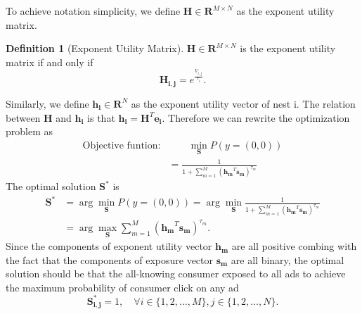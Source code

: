 \documentclass[12pt]{article}
\theoremstyle{definition}
\newtheorem{definition}{Definition}[section]
\newcommand{\matr}[1]{\mathbf{#1}} %
\begin{document}
\begin{sloppypar}
To achieve notation simplicity, we define $\matr{H} \in \mathbf{R}^{M \times N}$ as the exponent utility matrix.
\begin{definition}[Exponent Utility Matrix]\label{exponent}
    $\matr{H} \in \mathbf{R}^{M \times N}$ is the exponent utility matrix if and only if 
    \begin{equation*}
        \matr{H_{i,j}} = e^\frac{{V_{i,j}}}{\tau_i}.
    \end{equation*}
\end{definition}
Similarly, we define $\matr{h_i} \in \mathbf{R}^{N}$ as the exponent utility vector of nest i. The relation between $\matr{H}$ and $\matr{h_i}$ is that $\matr{h_i} = \matr{H}^T \matr{e_i}$.
Therefore we can rewrite the optimization problem as
\begin{align}
    \text{Objective funtion:} &\qquad \min_{\matr{S}} P(y=(0,0)) \nonumber \\
    &= \frac{1}{1+\sum_{m=1}^{M}(\matr{h_m}^T \matr{s_m})^{\tau_m}}
\end{align}
The optimal solution $\matr{S}^*$ is
\begin{align}\label{optimal}
    \matr{S}^* &= \arg\min_{\matr{S}} P(y=(0,0)) = \arg\min_{\matr{S}} \frac{1}{1+\sum_{m=1}^{M}(\matr{h_m}^T \matr{s_m})^{\tau_m}} \nonumber \\
    &= \arg\max_{\matr{S}} \sum_{m=1}^{M}(\matr{h_m}^T \matr{s_m})^{\tau_m}.
\end{align}
Since the components of exponent utility vector $\matr{h_m}$ are all positive combing with the fact that the components of exposure vector $\matr{s_m}$ are all binary, the optimal solution should be that the all-knowing consumer exposed to all ads to achieve the maximum probability of consumer click on any ad
\begin{equation}
    \matr{S^*_{i,j}} = 1, \quad \forall i \in \{1,2,...,M\}, j \in \{1,2,...,N\}.
\end{equation}


\end{sloppypar}
\end{document}
